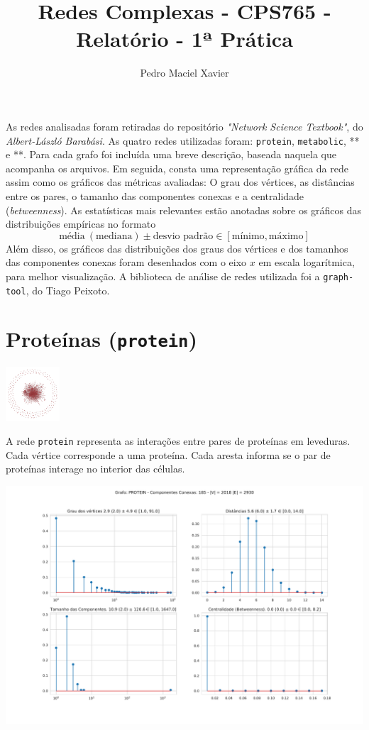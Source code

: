 \documentclass{homework}
\title{Redes Complexas - CPS765 -%
	Relatório - 1ª Prática}
\author{Pedro Maciel Xavier}
\begin{document}
	
	\smaketitle
	\vspace*{-5pt}
	As redes analisadas foram retiradas do repositório \textit{"Network Science Textbook"}\cite{barabasi:20}, do \textit{Albert-László Barabási}. As quatro redes utilizadas foram: \texttt{protein}, \texttt{metabolic}, ** e **. Para cada grafo foi incluída uma breve descrição, baseada naquela que acompanha os arquivos. Em seguida, consta uma representação gráfica da rede assim como os gráficos das métricas avaliadas: O grau dos vértices, as distâncias entre os pares, o tamanho das componentes conexas e a centralidade (\textit{betweenness}). As estatísticas mais relevantes estão anotadas sobre os gráficos das distribuições empíricas no formato
	$$\text{média} ~ (\text{mediana}) \pm \text{desvio padrão} \in [\text{mínimo}, \text{máximo}]$$
	Além disso, os gráficos das distribuições dos graus dos vértices e dos tamanhos das componentes conexas foram desenhados com o eixo $x$ em escala logarítmica, para melhor visualização. A biblioteca de análise de redes utilizada foi a \texttt{graph-tool}\cite{peixoto:14}, do Tiago Peixoto.
	\vspace*{-5pt}
	\vspace*{-5pt} 	
	\section{Proteínas (\texttt{protein})}	
	\begin{multicols}{2}
	\begin{fig}
		\includegraphics[width=0.15\textwidth]{../results/protein-graph.png}
	\end{fig}

	A rede \texttt{protein} representa as interações entre pares de proteínas em leveduras. Cada vértice corresponde a uma proteína. Cada aresta informa se o par de proteínas interage no interior das células.
	\end{multicols}
	
	\begin{fig}
		\includegraphics[width=\textwidth]{../results/protein-data.pdf}
	\end{fig}
	
\end{document}

